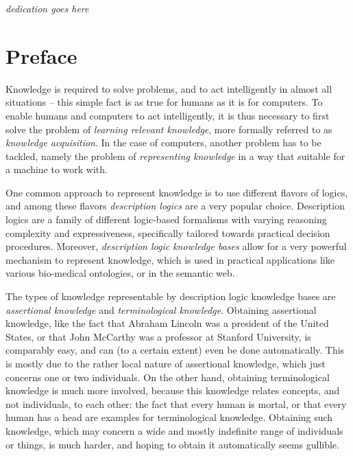 \vspace*{23ex}

\centerline{\textit{dedication goes here}}

\chapter*{Preface}
\label{cha:preface}

\thispagestyle{empty}

Knowledge is required to solve problems, and to act intelligently in almost all situations
-- this simple fact is as true for humans as it is for computers.  To enable humans and
computers to act intelligently, it is thus necessary to first solve the problem of
\emph{learning relevant knowledge}, more formally referred to as \emph{knowledge
  acquisition}.  In the case of computers, another problem has to be tackled, namely the
problem of \emph{representing knowledge} in a way that suitable for a machine to work
with.

One common approach to represent knowledge is to use different flavors of logics, and
among these flavors \emph{description logics} are a very popular choice.  Description
logics are a family of different logic-based formalisms with varying reasoning complexity
and expressiveness, specifically tailored towards practical decision procedures.
Moreover, \emph{description logic knowledge bases} allow for a very powerful mechanism to
represent knowledge, which is used in practical applications like various bio-medical
ontologies, or in the semantic web.

The types of knowledge representable by description logic knowledge bases are
\emph{assertional knowledge} and \emph{terminological knowledge}.  Obtaining assertional
knowledge, like the fact that Abraham Lincoln was a president of the United States, or
that John McCarthy was a professor at Stanford University, is comparably easy, and can (to
a certain extent) even be done automatically.  This is mostly due to the rather local
nature of assertional knowledge, which just concerns one or two individuals.  On the other
hand, obtaining terminological knowledge is much more involved, because this knowledge
relates concepts, and not individuals, to each other: the fact that every human is mortal,
or that every human has a head are examples for terminological knowledge.  Obtaining such
knowledge, which may concern a wide and mostly indefinite range of individuals or things,
is much harder, and hoping to obtain it automatically seems gullible.

